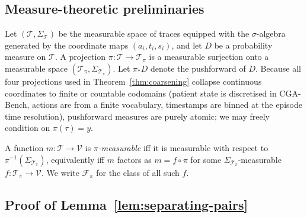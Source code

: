 \providecommand{\coloneqq}{\mathrel{:=}}

%
%   
%

\subsection{Measure-theoretic preliminaries}
\label{app:thm-prelim}

Let $(\mathcal{T},\Sigma_{\mathcal{T}})$ be the measurable space of traces
equipped with the $\sigma$-algebra generated by the coordinate maps
$(a_i,t_i,s_i)$, and let $D$ be a probability measure on $\mathcal{T}$.
A projection $\pi:\mathcal{T}\to\mathcal{T}_\pi$ is a measurable surjection onto a
measurable space $(\mathcal{T}_\pi,\Sigma_{\mathcal{T}_\pi})$. Let $\pi_\ast D$
denote the pushforward of $D$. Because all four projections used in
Theorem~\ref{thm:coarsening} collapse continuous coordinates to finite
or countable codomains (patient state is discretised in CGA-Bench,
actions are from a finite vocabulary, timestamps are binned at the
episode time resolution), pushforward measures are purely atomic; we
may freely condition on $\pi(\tau)=y$.

A function $m:\mathcal{T}\to\mathcal{V}$ is \emph{$\pi$-measurable} iff it is
measurable with respect to $\pi^{-1}(\Sigma_{\mathcal{T}_\pi})$, equivalently
iff $m$ factors as $m=f\circ\pi$ for some $\Sigma_{\mathcal{T}_\pi}$-measurable
$f:\mathcal{T}_\pi\to\mathcal{V}$. We write $\mathcal{F}_\pi$ for the class of all such $f$.

\subsection{Proof of Lemma~\ref{lem:separating-pairs}}
\label{app:thm-separating-pairs}

